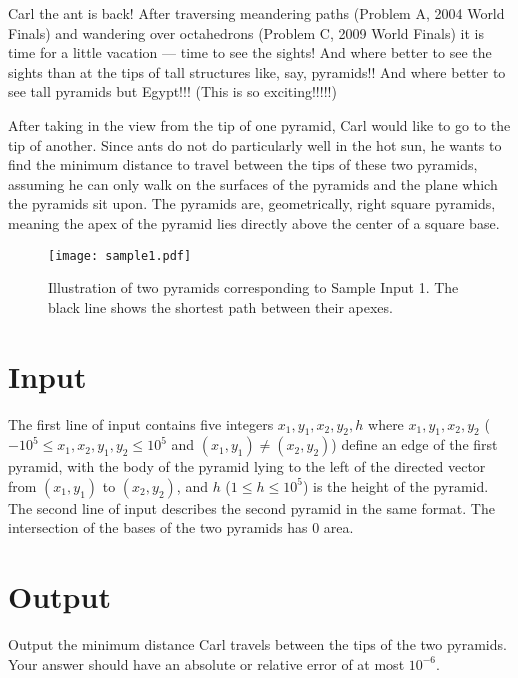 
\newcommand{\maxc}{10^5}

Carl the ant is back! After traversing meandering paths (Problem A, 2004 World Finals) and wandering over octahedrons (Problem C, 2009 World Finals) it is time for a little vacation --- time to see the sights!  And where better to see the sights than at the tips of tall structures like, say, pyramids!!  And where better to see tall pyramids but Egypt!!! (This is so exciting!!!!!)
 
After taking in the view from the tip of one pyramid, Carl would like to go to the tip of another.  Since ants do not do particularly well in the hot sun, he wants to find the minimum distance to travel between the tips of these two pyramids, assuming he can only walk on the surfaces of the pyramids and the plane which the pyramids sit upon.  The pyramids are, geometrically, right square pyramids, meaning the apex of the pyramid lies directly above the center of a square base.

\begin{figure}[h]
    \begin{center}
        \texttt{[image: sample1.pdf]}
    \end{center}
    \caption{\label{fig:sample1} Illustration of two pyramids corresponding to Sample Input 1. The black line shows the shortest path between their apexes.}
\end{figure}

\section*{Input}
The first line of input contains five integers $x_1, y_1, x_2, y_2, h$ where $x_1, y_1, x_2, y_2$ ($-\maxc \leq x_1,x_2,y_1,y_2 \leq \maxc$ and $(x_1, y_1) \ne (x_2, y_2)$) define an edge of the first pyramid, with the body of the pyramid lying to the left of the directed vector from $(x_1, y_1)$ to $(x_2, y_2)$, and $h$ ($1 \leq h \leq \maxc$) is the height of the pyramid.
The second line of input describes the second pyramid in the same format.  The intersection of the bases of the two pyramids has $0$ area.
\section*{Output}
Output the minimum distance Carl travels between the tips of the two pyramids. Your answer should have an absolute or relative error of at most $10^{-6}$.
